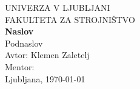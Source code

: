 \begin{titlepage}
\begin{center}
\large UNIVERZA V LJUBLJANI
\\[1cm]
\large FAKULTETA ZA STROJNIŠTVO
\\[6cm]
	\Large\textbf{Naslov}
\\[0.5cm]
Podnaslov
\\[4cm]
Avtor: Klemen Zaletelj
\\[0.5cm]
Mentor:
\\[3cm]
Ljubljana, \today
\end{center}
\end{titlepage}